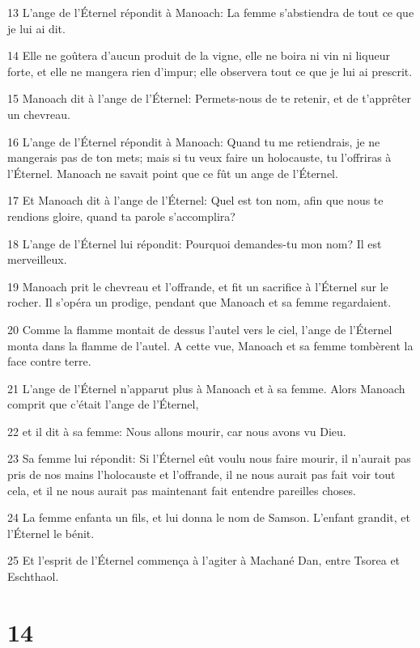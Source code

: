 \par 13 L'ange de l'Éternel répondit à Manoach: La femme s'abstiendra de tout ce que je lui ai dit.
\par 14 Elle ne goûtera d'aucun produit de la vigne, elle ne boira ni vin ni liqueur forte, et elle ne mangera rien d'impur; elle observera tout ce que je lui ai prescrit.
\par 15 Manoach dit à l'ange de l'Éternel: Permets-nous de te retenir, et de t'apprêter un chevreau.
\par 16 L'ange de l'Éternel répondit à Manoach: Quand tu me retiendrais, je ne mangerais pas de ton mets; mais si tu veux faire un holocauste, tu l'offriras à l'Éternel. Manoach ne savait point que ce fût un ange de l'Éternel.
\par 17 Et Manoach dit à l'ange de l'Éternel: Quel est ton nom, afin que nous te rendions gloire, quand ta parole s'accomplira?
\par 18 L'ange de l'Éternel lui répondit: Pourquoi demandes-tu mon nom? Il est merveilleux.
\par 19 Manoach prit le chevreau et l'offrande, et fit un sacrifice à l'Éternel sur le rocher. Il s'opéra un prodige, pendant que Manoach et sa femme regardaient.
\par 20 Comme la flamme montait de dessus l'autel vers le ciel, l'ange de l'Éternel monta dans la flamme de l'autel. A cette vue, Manoach et sa femme tombèrent la face contre terre.
\par 21 L'ange de l'Éternel n'apparut plus à Manoach et à sa femme. Alors Manoach comprit que c'était l'ange de l'Éternel,
\par 22 et il dit à sa femme: Nous allons mourir, car nous avons vu Dieu.
\par 23 Sa femme lui répondit: Si l'Éternel eût voulu nous faire mourir, il n'aurait pas pris de nos mains l'holocauste et l'offrande, il ne nous aurait pas fait voir tout cela, et il ne nous aurait pas maintenant fait entendre pareilles choses.
\par 24 La femme enfanta un fils, et lui donna le nom de Samson. L'enfant grandit, et l'Éternel le bénit.
\par 25 Et l'esprit de l'Éternel commença à l'agiter à Machané Dan, entre Tsorea et Eschthaol.

\chapter{14}

